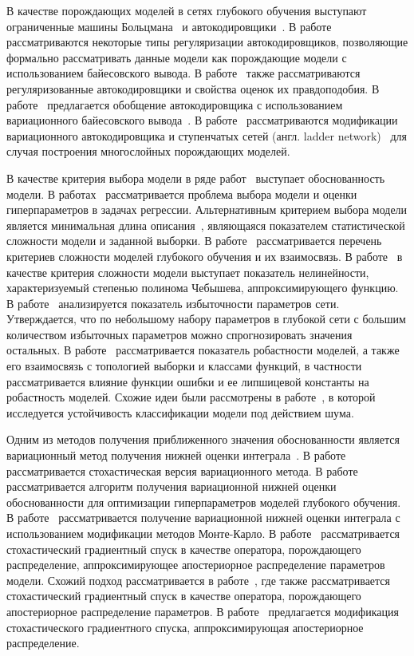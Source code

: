 В качестве порождающих моделей в сетях глубокого обучения выступают ограниченные машины Больцмана~\cite{hinton_rbm} и автокодировщики~\cite{founds}. В работе~\cite{contractive} рассматриваются некоторые типы регуляризации автокодировщиков, позволяющие формально рассматривать данные модели как порождающие модели с использованием байесовского вывода. В работе~\cite{score} также рассматриваются регуляризованные автокодировщики и свойства оценок их правдоподобия. В работе~\cite{vae} предлагается обобщение автокодировщика с использованием вариационного байесовского вывода~\cite{bishop}. В работе~\cite{train_generative} рассматриваются модификации вариационного автокодировщика и ступенчатых сетей (англ. ladder network)~\cite{ladder} для случая построения многослойных порождающих моделей. 

В качестве критерия выбора модели в ряде работ~\cite{mackay,bishop,tokmakova,zaitsev,strijov_webber, strijov_dsc} выступает обоснованность модели. В работах~\cite{tokmakova,zaitsev,strijov_webber, strijov_dsc} рассматривается проблема выбора модели и оценки гиперпараметров в задачах регрессии. Альтернативным критерием выбора модели является минимальная длина описания~\cite{mdl}, являющаяся показателем статистической сложности модели и заданной выборки. 
В работе~\cite{perekrestenko} рассматривается перечень критериев сложности моделей глубокого обучения и их взаимосвязь. В работе~\cite{vladis} в качестве критерия сложности модели выступает показатель нелинейности, характеризуемый степенью полинома Чебышева, аппроксимирующего функцию. В работе~\cite{need_prune} анализируется показатель избыточности параметров сети. Утверждается, что по небольшому набору параметров в глубокой сети с большим количеством избыточных параметров можно спрогнозировать значения остальных. В работе~\cite{rob} рассматривается показатель робастности моделей, а также его взаимосвязь с топологией выборки и классами функций, в частности рассматривается влияние функции ошибки и ее липшицевой константы на робастность моделей. Схожие идеи были рассмотрены в работе~\cite{intrig}, в которой исследуется устойчивость классификации модели под действием шума. 

Одним из методов получения приближенного значения обоснованности является вариационный метод получения нижней оценки интеграла~\cite{bishop}. В работе~\cite{hoffman} рассматривается стохастическая версия вариационного метода. В работе~\cite{nips} рассматривается алгоритм получения вариационной нижней оценки обоснованности  для оптимизации гиперпараметров моделей глубокого обучения. В работе~\cite{varmc} рассматривается получение вариационной нижней оценки интеграла с использованием модификации методов Монте-Карло. В работе~\cite{early} рассматривается стохастический градиентный спуск в качестве оператора, порождающего распределение, аппроксимирующее апостериорное распределение параметров модели. Схожий подход рассматривается в работе~\cite{sgd_cont}, где также рассматривается стохастический градиентный спуск в качестве оператора, порождающего апостериорное распределение параметров. В работе~\cite{langevin} предлагается модификация стохастического градиентного спуска, аппроксимирующая апостериорное распределение. 

